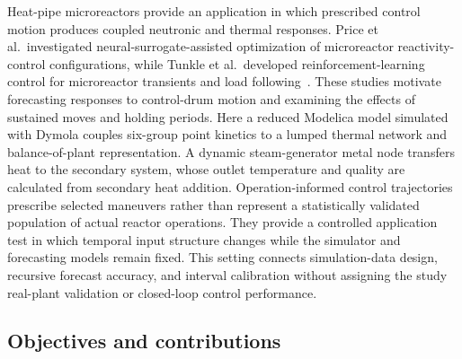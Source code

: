 Heat-pipe microreactors provide an application in which prescribed control motion produces coupled neutronic and thermal responses. Price et al.\ investigated neural-surrogate-assisted optimization of microreactor reactivity-control configurations, while Tunkle et al.\ developed reinforcement-learning control for microreactor transients and load following~\cite{price2022microreactor,tunkle2025microreactor}. These studies motivate forecasting responses to control-drum motion and examining the effects of sustained moves and holding periods. Here a reduced Modelica model simulated with Dymola couples six-group point kinetics to a lumped thermal network and balance-of-plant representation. A dynamic steam-generator metal node transfers heat to the secondary system, whose outlet temperature and quality are calculated from secondary heat addition. Operation-informed control trajectories prescribe selected maneuvers rather than represent a statistically validated population of actual reactor operations. They provide a controlled application test in which temporal input structure changes while the simulator and forecasting models remain fixed. This setting connects simulation-data design, recursive forecast accuracy, and interval calibration without assigning the study real-plant validation or closed-loop control performance.

\subsection{Objectives and contributions}
\label{sec:intro:contributions}

